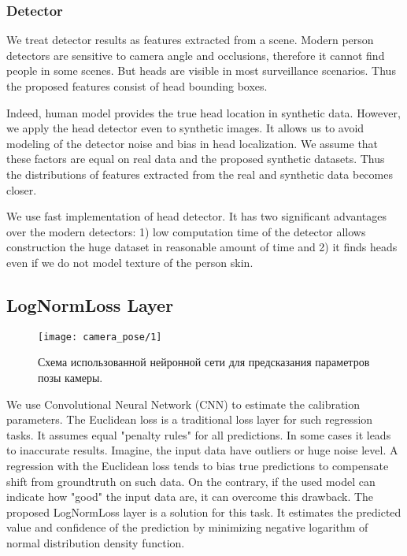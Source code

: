 \subsubsection{Detector}

\noindent We treat detector results as features extracted from a scene.
Modern person detectors are sensitive to camera angle and occlusions, therefore it cannot find people in some scenes. But heads are visible in most surveillance scenarios. Thus the proposed features consist of head bounding boxes.

Indeed, human model \cite{pishchulin2015building} provides the true head location in synthetic data. However, we apply the head detector even to synthetic images. It allows us to avoid modeling of the detector noise and bias in head localization. We assume that these factors are equal on real data and the proposed synthetic datasets. Thus the distributions of features extracted from the real and synthetic data becomes closer.

We use fast implementation \cite{prisacariu2009fasthog} of head detector. It has two significant advantages over the modern detectors: 1) low computation time of the detector allows construction the huge dataset in reasonable amount of time and 2) it finds heads even if we do not model texture of the person skin.

\subsection{LogNormLoss Layer}
\label{sec:lognormloss}


\begin{figure*}[!t]
	\centering
	\texttt{[image: camera\_pose/1]}
	\caption{Схема использованной нейронной сети для предсказания параметров позы камеры.}
	\label{fig:net}
\end{figure*}


We use Convolutional Neural Network (CNN) to estimate the calibration parameters. The Euclidean loss is a traditional loss layer for such regression tasks. It assumes equal "penalty rules" for all predictions. In some cases it leads to inaccurate results. Imagine, the input data have outliers or huge noise level. A regression with the Euclidean loss tends to bias true predictions to compensate shift from groundtruth on such data. On the contrary, if the used model can indicate how "good" the input data are, it can overcome this drawback. The proposed LogNormLoss layer is a solution for this task. It estimates the predicted value and confidence of the prediction by minimizing negative logarithm of normal distribution density function.

